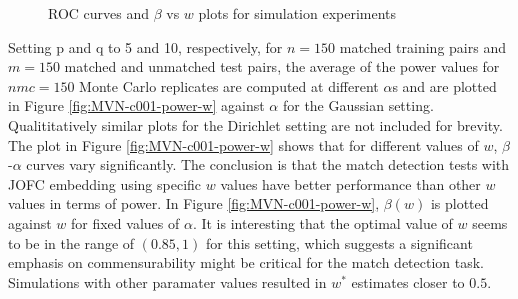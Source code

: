 \documentclass[11pt]{article} %
\begin{document}
\begin{figure}
  \caption {ROC curves and $\beta$ vs $w$ plots for simulation experiments}
  \end{figure}


Setting p and q to 5 and 10, respectively, for $n=150$ matched training pairs and $m=150$ matched and unmatched test pairs, the average of the power values for $nmc=150$ Monte Carlo replicates are computed at  different $\alpha$s and are plotted in Figure \ref{fig:MVN-c001-power-w} against $\alpha$ for the Gaussian setting.  Qualititatively similar plots for the Dirichlet setting  are not included for brevity.  The plot in Figure \ref{fig:MVN-c001-power-w} shows that for different values of  $w$, $\beta$-$\alpha$ curves vary significantly.  The conclusion is that the match detection tests with JOFC embedding using specific $w$ values have better performance than other $w$ values in terms of power.  In Figure
 \ref{fig:MVN-c001-power-w},  $\beta(w)$ is plotted against $w$ for fixed values of $\alpha$. It is  interesting that the optimal value of $w$ seems to be in the range of $(0.85,1)$ for this setting, which suggests a significant emphasis on commensurability might be  critical for the match detection  task. Simulations with other paramater values  resulted in $w^*$ estimates closer to $0.5$.
\end{document}
